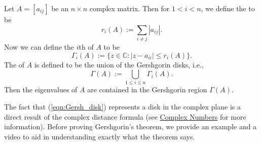 \documentclass{ximera}
\begin{document}
\begin{theorem}[Gershgorin]\label{th:Gershgorin}
Let $A=[a_{ij}]$ be an $n\times n$ complex matrix.  Then for $1<i<n$, we define the  to be
$$
r_i(A):= \sum_{i \ne j} |a_{ij}|.
$$
Now we can define the $i$th  of $A$ to be
\begin{equation}\label{eqn:Gersh_disk}
\Gamma_i(A) := \{ z \in \mathbb{C} : |z-a_{ii}| \le r_i(A) \}.
\end{equation}
 The  of $A$ is defined to be the union of the Gershgorin disks, i.e.,
$$
\Gamma(A) := \bigcup_{1 \le i \le n} \Gamma_i(A).
$$
Then the eigenvalues of $A$ are contained in the Gershgorin region $\Gamma(A)$.
\end{theorem}

The fact that (\ref{eqn:Gersh_disk}) represents a disk in the complex plane is a direct result of the complex distance formula  (see \href{https://ximera.osu.edu/linearalgebradzv3/LinearAlgebraInteractiveIntro/APX-0020/main}{Complex Numbers} for more information). Before proving Gershgorin's theorem, we provide an example and a video to aid in understanding exactly what the theorem says.

\end{document}
